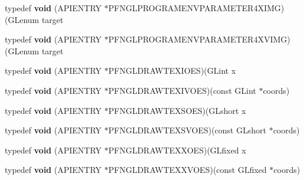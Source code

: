 \begin{DoxyCompactItemize}
\item 
\hypertarget{class_c_p_v_r_tgles_ext_ab475828347ceeef402580e8650f38610}{typedef {\bfseries void} (A\+P\+I\+E\+N\+T\+R\+Y $\ast$P\+F\+N\+G\+L\+P\+R\+O\+G\+R\+A\+M\+E\+N\+V\+P\+A\+R\+A\+M\+E\+T\+E\+R4\+X\+I\+M\+G)(G\+Lenum target}\label{class_c_p_v_r_tgles_ext_ab475828347ceeef402580e8650f38610}

\item 
\hypertarget{class_c_p_v_r_tgles_ext_acecf0a2ada2b3803387f73f0500dc177}{typedef {\bfseries void} (A\+P\+I\+E\+N\+T\+R\+Y $\ast$P\+F\+N\+G\+L\+P\+R\+O\+G\+R\+A\+M\+E\+N\+V\+P\+A\+R\+A\+M\+E\+T\+E\+R4\+X\+V\+I\+M\+G)(G\+Lenum target}\label{class_c_p_v_r_tgles_ext_acecf0a2ada2b3803387f73f0500dc177}

\item 
\hypertarget{class_c_p_v_r_tgles_ext_ae08de98d59e9ae9c4a72c72f1fbe3e84}{typedef {\bfseries void} (A\+P\+I\+E\+N\+T\+R\+Y $\ast$P\+F\+N\+G\+L\+D\+R\+A\+W\+T\+E\+X\+I\+O\+E\+S)(G\+Lint x}\label{class_c_p_v_r_tgles_ext_ae08de98d59e9ae9c4a72c72f1fbe3e84}

\item 
\hypertarget{class_c_p_v_r_tgles_ext_a4d93c613aa2dc676bc07953714d38514}{typedef {\bfseries void} (A\+P\+I\+E\+N\+T\+R\+Y $\ast$P\+F\+N\+G\+L\+D\+R\+A\+W\+T\+E\+X\+I\+V\+O\+E\+S)(const G\+Lint $\ast$coords)}\label{class_c_p_v_r_tgles_ext_a4d93c613aa2dc676bc07953714d38514}

\item 
\hypertarget{class_c_p_v_r_tgles_ext_a5950ba1bfcaa516baae842221100c686}{typedef {\bfseries void} (A\+P\+I\+E\+N\+T\+R\+Y $\ast$P\+F\+N\+G\+L\+D\+R\+A\+W\+T\+E\+X\+S\+O\+E\+S)(G\+Lshort x}\label{class_c_p_v_r_tgles_ext_a5950ba1bfcaa516baae842221100c686}

\item 
\hypertarget{class_c_p_v_r_tgles_ext_a63e28998863b03758b159a9e2f686ae9}{typedef {\bfseries void} (A\+P\+I\+E\+N\+T\+R\+Y $\ast$P\+F\+N\+G\+L\+D\+R\+A\+W\+T\+E\+X\+S\+V\+O\+E\+S)(const G\+Lshort $\ast$coords)}\label{class_c_p_v_r_tgles_ext_a63e28998863b03758b159a9e2f686ae9}

\item 
\hypertarget{class_c_p_v_r_tgles_ext_ac34c8f986a3bcb4885ea2210bdca3518}{typedef {\bfseries void} (A\+P\+I\+E\+N\+T\+R\+Y $\ast$P\+F\+N\+G\+L\+D\+R\+A\+W\+T\+E\+X\+X\+O\+E\+S)(G\+Lfixed x}\label{class_c_p_v_r_tgles_ext_ac34c8f986a3bcb4885ea2210bdca3518}

\item 
\hypertarget{class_c_p_v_r_tgles_ext_a423a54b1b4c2e070d1a56df2690e0104}{typedef {\bfseries void} (A\+P\+I\+E\+N\+T\+R\+Y $\ast$P\+F\+N\+G\+L\+D\+R\+A\+W\+T\+E\+X\+X\+V\+O\+E\+S)(const G\+Lfixed $\ast$coords)}\label{class_c_p_v_r_tgles_ext_a423a54b1b4c2e070d1a56df2690e0104}


\end{DoxyCompactItemize}
